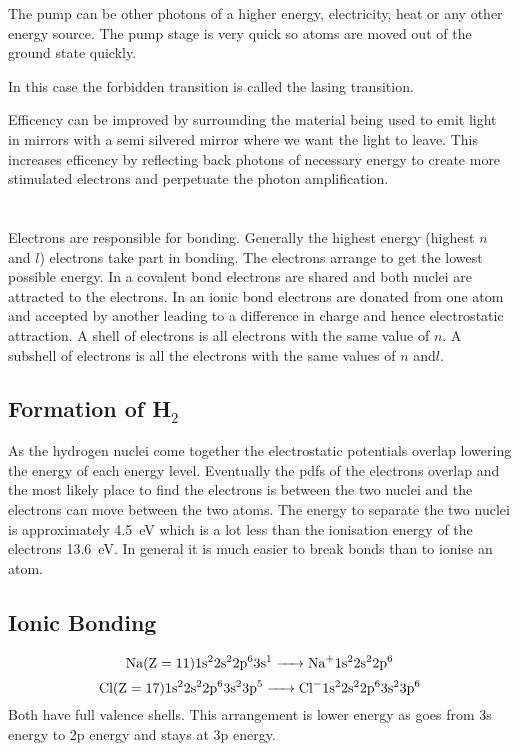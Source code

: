 The pump can be other photons of a higher energy, electricity, heat or any other energy source. The pump stage is very quick so atoms are moved out of the ground state quickly.

In this case the forbidden transition is called the lasing transition.

Efficency can be improved by surrounding the material being used to emit light in mirrors with a semi silvered mirror where we want the light to leave. This increases efficency by reflecting back photons of necessary energy to create more stimulated electrons and perpetuate the photon amplification.

\section{}

Electrons are responsible for bonding. Generally the highest energy (highest \(n\) and \(l\)) electrons take part in bonding. The electrons arrange to get the lowest possible energy. In a covalent bond electrons are shared and both nuclei are attracted to the electrons. In an ionic bond electrons are donated from one atom and accepted by another leading to a difference in charge and hence electrostatic attraction. A shell of electrons is all electrons with the same value of \(n\). A subshell of electrons is all the electrons with the same values of \(n\) and\(l\). 

\subsection*{Formation of H\(_2\)}

As the hydrogen nuclei come together the electrostatic potentials overlap lowering the energy of each energy level. Eventually the pdfs of the electrons overlap and the most likely place to find the electrons is between the two nuclei and the electrons can move between the two atoms. The energy to separate the two nuclei is approximately \SI{4.5}{eV} which is a lot less than the ionisation energy of the electrons \SI{13.6}{eV}. In general it is much easier to break bonds than to ionise an atom.

\subsection*{Ionic Bonding}

\[\text{\ce{Na}}(\mathrm{Z}=11)\mathrm{1s^22s^22p^63s^1}\ce{->Na+}\mathrm{1s^22s^22p^6}\]
\[\text{\ce{Cl}}(\mathrm{Z}=17)\mathrm{1s^22s^22p^63s^23p^5}\ce{->Cl-}\mathrm{1s^22s^22p^63s^23p^6}\]
Both have full valence shells. This arrangement is lower energy as  goes from 3s energy to 2p energy and  stays at 3p energy.

